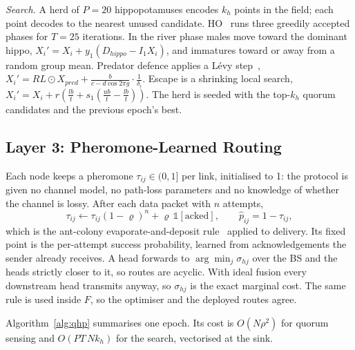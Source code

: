 \documentclass[conference]{IEEEtran}
\begin{document}
\emph{Search.} A herd of $P{=}20$ hippopotamuses encodes $k_h$ points in the field; each point decodes to the nearest unused candidate. HO~\cite{amiri2024hippo} runs three greedily accepted phases for $T{=}25$ iterations. In the river phase males move toward the dominant hippo, $X_i'=X_i+y_1(D_{hippo}-I_1X_i)$, and immatures toward or away from a random group mean. Predator defence applies a L\'evy step~\cite{mantegna1994levy}, $X_i'=RL\odot X_{pred}+\frac{b}{c-d\cos 2\pi g}\cdot\frac{1}{\delta_i}$. Escape is a shrinking local search, $X_i'=X_i+r(\frac{lb}{t}+s_1(\frac{ub}{t}-\frac{lb}{t}))$. The herd is seeded with the top-$k_h$ quorum candidates and the previous epoch's best.

\subsection{Layer 3: Pheromone-Learned Routing}
Each node keeps a pheromone $\tau_{ij}\in(0,1]$ per link, initialised to 1: the protocol is given no channel model, no path-loss parameters and no knowledge of whether the channel is lossy. After each data packet with $n$ attempts,
\begin{equation}
\tau_{ij}\leftarrow\tau_{ij}(1-\varrho)^{n}+\varrho\,\mathbb 1[\text{acked}],\qquad \hat p_{ij}=1-\tau_{ij},
\label{eq:pheromone}
\end{equation}
which is the ant-colony evaporate-and-deposit rule~\cite{dorigo2006aco} applied to delivery. Its fixed point is the per-attempt success probability, learned from acknowledgements the sender already receives. A head forwards to $\arg\min_{j}\sigma_{hj}$ over the BS and the heads strictly closer to it, so routes are acyclic. With ideal fusion every downstream head transmits anyway, so $\sigma_{hj}$ is the exact marginal cost. The same rule is used inside $F$, so the optimiser and the deployed routes agree.

Algorithm~\ref{alg:qhp} summarises one epoch. Its cost is $O(N\rho^2)$ for quorum sensing and $O(PT\,N k_h)$ for the search, vectorised at the sink.
\end{document}
